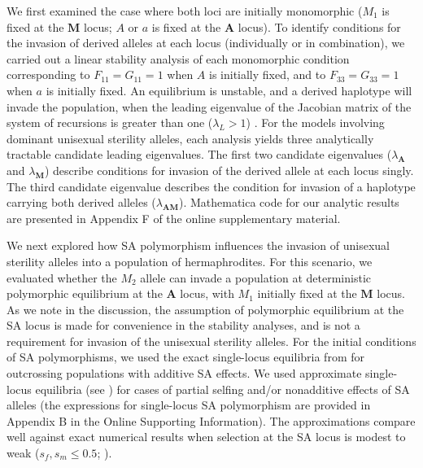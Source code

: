 \documentclass{article}
\newcommand\hl[1]{%
  \bgroup
  \hskip0pt\color{blue!80!black}%
  #1%
  \egroup
}
\begin{document}
We first examined the case where both loci are initially monomorphic ($M_1$ is fixed at the $\mathbf{M}$ locus; $A$ or $a$ is fixed at the $\mathbf{A}$ locus). To identify conditions for the invasion of derived alleles at each locus (individually or in combination), we carried out a linear stability analysis of each monomorphic condition corresponding to $F_{11} = G_{11} = 1$ when $A$ is initially fixed, and to $F_{33} = G_{33} = 1$ when $a$ is initially fixed. An equilibrium is unstable, and a derived haplotype will invade the population, when the leading eigenvalue of the Jacobian matrix of the system of recursions is greater than one ($\lambda_L > 1$) \citep{OttoDay2007}. For the models involving dominant unisexual sterility alleles, each analysis yields three analytically tractable candidate leading eigenvalues. The first two candidate eigenvalues ($\lambda_{\mathbf{A}}$ and $\lambda_{\mathbf{M}}$) describe conditions for invasion of the derived allele at each locus singly. The third candidate eigenvalue describes the condition for invasion of a haplotype carrying both derived alleles ($\lambda_{\mathbf{AM}}$). Mathematica code for our analytic results are presented in Appendix F of the online supplementary material.

We next explored how SA polymorphism influences the invasion of unisexual sterility alleles into a population of hermaphrodites. For this scenario, we evaluated whether the $M_2$ allele can invade a population at deterministic polymorphic equilibrium at the $\mathbf{A}$ locus, with $M_1$ initially fixed at the $\mathbf{M}$ locus. \hl{As we note in the discussion, the assumption of polymorphic equilibrium at the SA locus is made for convenience in the stability analyses, and is not a requirement for invasion of the unisexual sterility alleles. For the initial conditions of SA polymorphisms, we used the exact single-locus equilibria from \citet{Kidwell1977} for outcrossing populations with additive SA effects. We used approximate single-locus equilibria (see \citealt{JordanConnallon2014,ConnallonJordan2016}) for cases of partial selfing and/or nonadditive effects of SA alleles (the expressions for single-locus SA polymorphism are provided in Appendix B in the Online Supporting Information). The approximations compare well against exact numerical results when selection at the SA locus is modest to weak ($s_f,s_m \leq 0.5$;} \citealt{JordanConnallon2014, ConnallonJordan2016, Olito2017}). %
\end{document}
